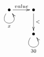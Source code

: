 $\xymatrix{
   \bullet \ar@(dl,dr)[]_{x} \ar[r]^{value} & \bullet \ar[d]^{<} \\
   & \bullet \ar@(dl,dr)[]_{30}
}$
